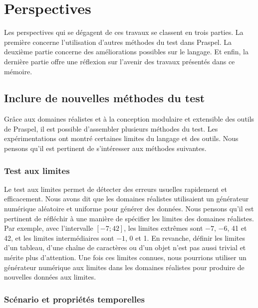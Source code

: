 \chapter{Perspectives}
\label{chapter:perspectives}

\minitoc

Les perspectives qui se dégagent de ces travaux se classent en trois parties. La
première concerne l'utilisation d'autres méthodes du test dans Praspel. La
deuxième partie concerne des améliorations possibles sur le langage. Et enfin,
la dernière partie offre une réflexion sur l'avenir des travaux présentés dans
ce mémoire.

\section{Inclure de nouvelles méthodes du test}

Grâce aux domaines réalistes et à la conception modulaire et extensible des
outils de Praspel, il est possible d'assembler plusieurs méthodes du test. Les
expérimentations ont montré certaines limites du langage et des outils. Nous
pensons qu'il est pertinent de s'intéresser aux méthodes suivantes.

\subsection{Test aux limites}

Le test aux limites permet de détecter des erreurs usuelles rapidement et
efficacement. Nous avons dit que les domaines réalistes utilisaient un
générateur numérique aléatoire et uniforme pour générer des données. Nous
pensons qu'il est pertinent de réfléchir à une manière de spécifier les limites
des domaines réalistes. Par exemple, avec l'intervalle $[-7; 42]$, les limites
extrêmes sont $-7$, $-6$, 41 et 42, et les limites intermédiaires sont $-1$, 0
et 1. En revanche, définir les limites d'un tableau, d'une chaîne de caractères
ou d'un objet n'est pas aussi trivial et mérite plus d'attention. Une fois ces
limites connues, nous pourrions utiliser un générateur numérique aux limites
dans les domaines réalistes pour produire de nouvelles données aux limites.

\subsection{Scénario et propriétés temporelles}


